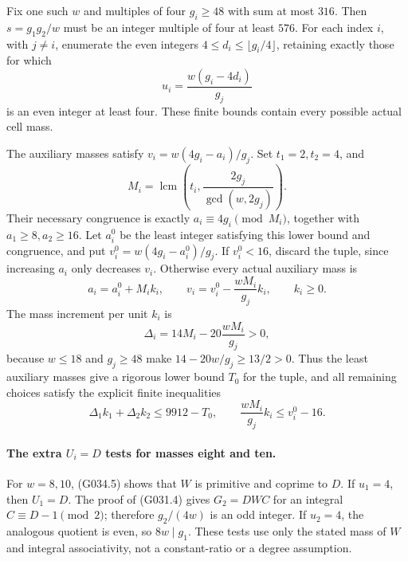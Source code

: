 Fix one such $w$ and multiples of four $g_i\ge48$
with sum at most $316$. Then $s=g_1g_2/w$ must be
an integer multiple of four at least $576$.
For each index $i$, with $j\ne i$, enumerate the
even integers $4\le d_i\le\lfloor g_i/4\rfloor$,
retaining exactly those for which
\[
             u_i=\frac{w(g_i-4d_i)}{g_j}
\]
is an even integer at least four. These finite bounds
contain every possible actual cell mass.

The auxiliary masses satisfy
$v_i=w(4g_i-a_i)/g_j$. Set $t_1=2,t_2=4$, and
\[
 M_i=\operatorname{lcm}\left(t_i,
                   \frac{2g_j}{\gcd(w,2g_j)}\right).
\]
Their necessary congruence is exactly
$a_i\equiv4g_i\pmod{M_i}$, together with
$a_1\ge8,a_2\ge16$.
Let $a_i^0$ be the least integer satisfying this lower
bound and congruence, and put
$v_i^0=w(4g_i-a_i^0)/g_j$. If $v_i^0<16$, discard
the tuple, since increasing $a_i$ only decreases $v_i$.
Otherwise every actual auxiliary mass is
\[
 a_i=a_i^0+M_i k_i,\qquad
 v_i=v_i^0-\frac{wM_i}{g_j}k_i,\qquad k_i\ge0.       \tag{G035.3}
\]
The mass increment per unit $k_i$ is
\[
 \Delta_i=14M_i-20\frac{wM_i}{g_j}>0,
\]
because $w\le18$ and $g_j\ge48$ make
$14-20w/g_j\ge13/2>0$.
Thus the least auxiliary masses give a rigorous lower
bound $T_0$ for the tuple, and all remaining choices
satisfy the explicit finite inequalities
\[
 \Delta_1k_1+\Delta_2k_2\le9912-T_0,\qquad
 \frac{wM_i}{g_j}k_i\le v_i^0-16.                   \tag{G035.4}
\]

\paragraph{The extra $U_i=D$ tests for masses eight and ten.}
For $w=8,10$, (G034.5) shows that $W$ is primitive
and coprime to $D$.
If $u_1=4$, then $U_1=D$. The proof of (G031.4)
gives $G_2=DWC$ for an integral $C\equiv D-1\pmod2$;
therefore $g_2/(4w)$ is an odd integer.
If $u_2=4$, the analogous quotient is even, so
$8w\mid g_1$. These tests use only the stated mass
of $W$ and integral associativity, not a constant-ratio
or a degree assumption.

